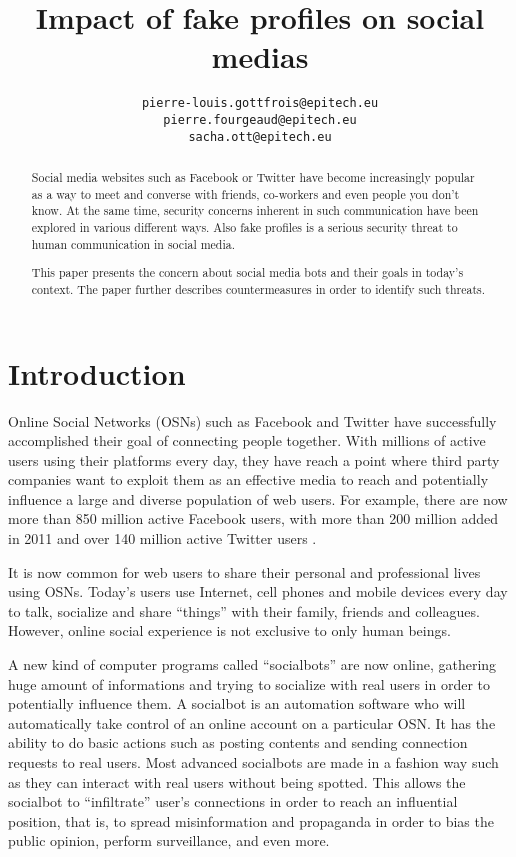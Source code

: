 \documentclass[12pt,a4paper]{article}
\title{Impact of fake profiles on social medias}
\author{
  \texttt{pierre-louis.gottfrois@epitech.eu} \\
  \texttt{pierre.fourgeaud@epitech.eu} \\
  \texttt{sacha.ott@epitech.eu}
}
\begin{document}
\ifpdf
{}
\else
{}
\fi

\maketitle

\begin{abstract}
  Social media websites such as Facebook or Twitter have become increasingly popular as
  a way to meet and converse with friends, co-workers and even people you don't know.
  At the same time, security concerns inherent in such communication have been explored
  in various different ways. Also fake profiles is a serious security threat to human
  communication in social media.

  This paper presents the concern about social media bots and their goals in today's context.
  The paper further describes countermeasures in order to identify such threats.
\end{abstract}

\section{Introduction}
Online Social Networks (OSNs) such as Facebook and Twitter have successfully accomplished
their goal of connecting people together. With millions of active users using their
platforms every day, they have reach a point where third party companies want to exploit
them as an effective media to reach and potentially influence a large and diverse
population of web users. For example, there are now more than 850 million active Facebook
users, with more than 200 million added in 2011 and over 140 million active Twitter
users \cite{stats_of_the_day}.

It is now common for web users to share their personal and professional lives using OSNs.
Today’s users use Internet, cell phones and mobile devices every day to talk, socialize
and share “things” with their family, friends and colleagues. However, online social
experience is not exclusive to only human beings.

A new kind of computer programs called “socialbots” are now online, gathering huge amount
of informations and trying to socialize with real users in order to potentially influence them.
A socialbot is an automation software who will automatically take control of an online
account on a particular OSN. It has the ability to do basic actions such as posting
contents and sending connection requests to real users. Most advanced socialbots are made
in a fashion way such as they can interact with real users without being spotted.
This allows the socialbot to “infiltrate” user’s connections in order to reach an
influential position, that is, to spread misinformation and propaganda in order to bias
the public opinion, perform surveillance, and even more.
\end{document}
